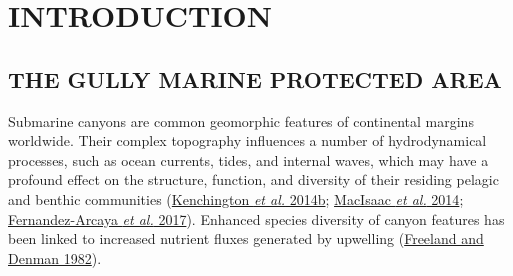 \documentclass[12pt]{article}\usepackage[]{graphicx}\usepackage[]{color}
\begin{document}

\frontmatter


\renewcommand{\headrulewidth}{0.5pt}  %
\renewcommand{\footrulewidth}{0.5pt}  %

\newcommand{\lt}{\ensuremath <}
\newcommand{\gt}{\ensuremath >}

\newlength{\cslhangindent}
\setlength{\cslhangindent}{1.5em}
\newenvironment{cslreferences}%
  {}%
  {\par}

\hypertarget{sec:introduction}{%
\section{INTRODUCTION}\label{sec:introduction}}

\hypertarget{the-gully-marine-protected-area}{%
\subsection{\texorpdfstring{\textbf{THE GULLY MARINE PROTECTED AREA}}{THE GULLY MARINE PROTECTED AREA}}\label{the-gully-marine-protected-area}}

Submarine canyons are common geomorphic features of continental margins worldwide. Their complex topography influences a number of hydrodynamical processes, such as ocean currents, tides, and internal waves, which may have a profound effect on the structure, function, and diversity of their residing pelagic and benthic communities (\protect\hyperlink{ref-kenchington_2014b}{Kenchington \textit{et al.} 2014b}; \protect\hyperlink{ref-macisaac_2014}{MacIsaac \textit{et al.} 2014}; \protect\hyperlink{ref-fernandez-arcaya_2017}{Fernandez-Arcaya \textit{et al.} 2017}). Enhanced species diversity of canyon features has been linked to increased nutrient fluxes generated by upwelling (\protect\hyperlink{ref-freeland_1982}{Freeland and Denman 1982}).
\end{document}
